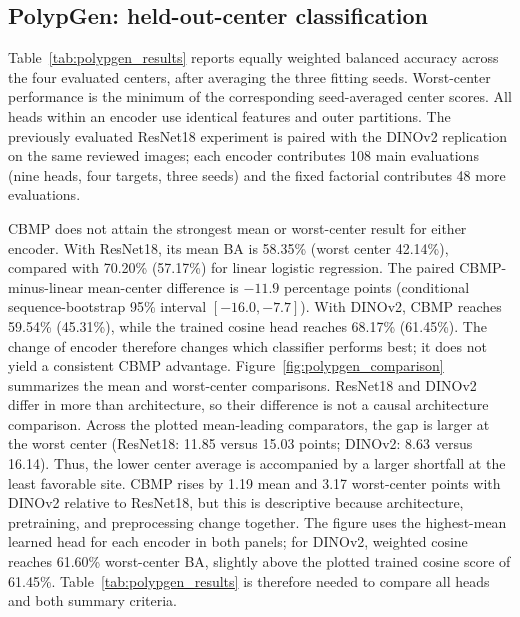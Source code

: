 \subsection{PolypGen: held-out-center classification}
Table~\ref{tab:polypgen_results} reports equally weighted balanced accuracy across the four evaluated centers, after averaging the three fitting seeds. Worst-center performance is the minimum of the corresponding seed-averaged center scores. All heads within an encoder use identical features and outer partitions. The previously evaluated ResNet18 experiment is paired with the DINOv2 replication on the same reviewed images; each encoder contributes 108 main evaluations (nine heads, four targets, three seeds) and the fixed factorial contributes 48 more evaluations.

CBMP does not attain the strongest mean or worst-center result for either encoder. With ResNet18, its mean BA is 58.35\% (worst center 42.14\%), compared with 70.20\% (57.17\%) for linear logistic regression. The paired CBMP-minus-linear mean-center difference is $-11.9$ percentage points (conditional sequence-bootstrap 95\% interval $[-16.0,-7.7]$). With DINOv2, CBMP reaches 59.54\% (45.31\%), while the trained cosine head reaches 68.17\% (61.45\%). The change of encoder therefore changes which classifier performs best; it does not yield a consistent CBMP advantage. Figure~\ref{fig:polypgen_comparison} summarizes the mean and worst-center comparisons. ResNet18 and DINOv2 differ in more than architecture, so their difference is not a causal architecture comparison. Across the plotted mean-leading comparators, the gap is larger at the worst center (ResNet18: 11.85 versus 15.03 points; DINOv2: 8.63 versus 16.14). Thus, the lower center average is accompanied by a larger shortfall at the least favorable site. CBMP rises by 1.19 mean and 3.17 worst-center points with DINOv2 relative to ResNet18, but this is descriptive because architecture, pretraining, and preprocessing change together. The figure uses the highest-mean learned head for each encoder in both panels; for DINOv2, weighted cosine reaches 61.60\% worst-center BA, slightly above the plotted trained cosine score of 61.45\%. Table~\ref{tab:polypgen_results} is therefore needed to compare all heads and both summary criteria.


